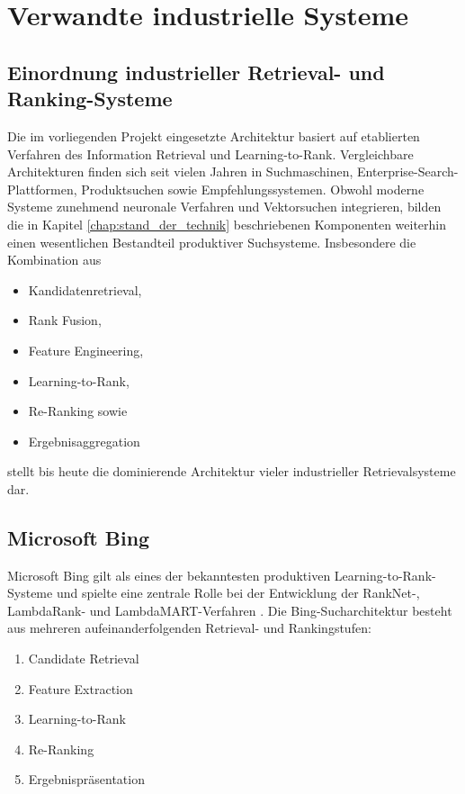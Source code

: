 \chapter{Verwandte industrielle Systeme}

\section{Einordnung industrieller Retrieval- und Ranking-Systeme}

Die im vorliegenden Projekt eingesetzte Architektur basiert auf etablierten Verfahren des Information Retrieval und Learning-to-Rank.
Vergleichbare Architekturen finden sich seit vielen Jahren in Suchmaschinen, Enterprise-Search-Plattformen, Produktsuchen sowie Empfehlungssystemen.
Obwohl moderne Systeme zunehmend neuronale Verfahren und Vektorsuchen integrieren, bilden die in Kapitel \ref{chap:stand_der_technik} beschriebenen Komponenten weiterhin einen wesentlichen Bestandteil produktiver Suchsysteme.
Insbesondere die Kombination aus

\begin{itemize}
  \item Kandidatenretrieval,
  \item Rank Fusion,
  \item Feature Engineering,
  \item Learning-to-Rank,
  \item Re-Ranking sowie
  \item Ergebnisaggregation
\end{itemize}

stellt bis heute die dominierende Architektur vieler industrieller Retrievalsysteme dar.

\section{Microsoft Bing}

Microsoft Bing gilt als eines der bekanntesten produktiven Learning-to-Rank-Systeme und spielte eine zentrale Rolle bei der Entwicklung der RankNet-, LambdaRank- und LambdaMART-Verfahren \cite{burges2010lambdamart}.
Die Bing-Sucharchitektur besteht aus mehreren aufeinanderfolgenden Retrieval- und Rankingstufen:

\begin{enumerate}
  \item Candidate Retrieval
  \item Feature Extraction
  \item Learning-to-Rank
  \item Re-Ranking
  \item Ergebnispräsentation
\end{enumerate}

